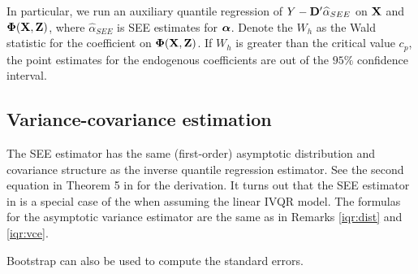 In particular, we run an auxiliary quantile regression of $Y -
\mathbf{D}'\widehat{\alpha}_{SEE}$ on $\mathbf{X}$ and $\boldsymbol{\Phi}(\mathbf{X}, \mathbf{Z})$, where
$\hat{\alpha}_{SEE}$ is SEE estimates for $\boldsymbol{\alpha}$. Denote the $W_{h}$ as the
Wald statistic for the coefficient on $\boldsymbol{\Phi}(\mathbf{X}, \mathbf{Z})$. If $W_h$ is greater
than the critical value $c_p$, the point estimates for the endogenous
coefficients are out of the $95\%$ confidence interval.



\subsection{Variance-covariance estimation}
The SEE estimator has the same (first-order) asymptotic distribution and
covariance structure as the inverse quantile regression estimator.  See the
second equation in Theorem 5 in \cite{DeCastro2019} for the derivation.  It
turns out that the SEE estimator in \cite{Kaplan2017} is a special case of the
\cite{DeCastro2019} when assuming the linear IVQR model.  The formulas for the
asymptotic variance estimator are the same as in Remarks \ref{iqr:dist} and
\ref{iqr:vce}. 

Bootstrap can also be used to compute the standard errors.
